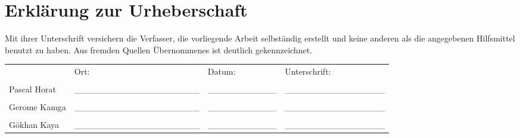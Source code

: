 \chapter*{Erklärung zur Urheberschaft}
Mit ihrer Unterschrift versichern die Verfasser, die vorliegende Arbeit selbständig erstellt und keine anderen als die angegebenen Hilfsmittel benutzt zu haben. Aus fremden Quellen Übernommenes ist deutlich gekennzeichnet.

\begin{center}
  \begin{tabular}{ p{2.5cm} p{4cm} p{2.3cm} p{4cm} }
   & Ort: & Datum: & Unterschrift: \\\\
   Pascal Horat & \_\_\_\_\_\_\_\_\_\_\_\_\_\_\_\_\_\_\_\_ & \_\_\_\_\_\_\_\_\_\_\_ & \_\_\_\_\_\_\_\_\_\_\_\_\_\_\_\_ \\\\
   Gerome Kamga & \_\_\_\_\_\_\_\_\_\_\_\_\_\_\_\_\_\_\_\_ & \_\_\_\_\_\_\_\_\_\_\_ & \_\_\_\_\_\_\_\_\_\_\_\_\_\_\_\_ \\\\
   Gökhan Kaya  & \_\_\_\_\_\_\_\_\_\_\_\_\_\_\_\_\_\_\_\_ & \_\_\_\_\_\_\_\_\_\_\_ & \_\_\_\_\_\_\_\_\_\_\_\_\_\_\_\_ \\ 
  \end{tabular}
\end{center}